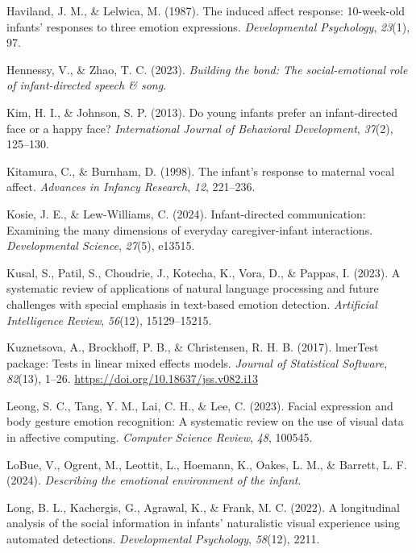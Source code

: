 \documentclass[10pt, letterpaper]{article}
\begin{document}
\begin{CSLReferences}{1}{0}
Haviland, J. M., \& Lelwica, M. (1987). The induced affect response:
10-week-old infants' responses to three emotion expressions.
\emph{Developmental Psychology}, \emph{23}(1), 97.

Hennessy, V., \& Zhao, T. C. (2023). \emph{Building the bond: The
social-emotional role of infant-directed speech \& song}.

Kim, H. I., \& Johnson, S. P. (2013). Do young infants prefer an
infant-directed face or a happy face? \emph{International Journal of
Behavioral Development}, \emph{37}(2), 125--130.

Kitamura, C., \& Burnham, D. (1998). The infant's response to maternal
vocal affect. \emph{Advances in Infancy Research}, \emph{12}, 221--236.

Kosie, J. E., \& Lew-Williams, C. (2024). Infant-directed communication:
Examining the many dimensions of everyday caregiver-infant interactions.
\emph{Developmental Science}, \emph{27}(5), e13515.

Kusal, S., Patil, S., Choudrie, J., Kotecha, K., Vora, D., \& Pappas, I.
(2023). A systematic review of applications of natural language
processing and future challenges with special emphasis in text-based
emotion detection. \emph{Artificial Intelligence Review}, \emph{56}(12),
15129--15215.

Kuznetsova, A., Brockhoff, P. B., \& Christensen, R. H. B. (2017).
{lmerTest} package: Tests in linear mixed effects models. \emph{Journal
of Statistical Software}, \emph{82}(13), 1--26.
\url{https://doi.org/10.18637/jss.v082.i13}

Leong, S. C., Tang, Y. M., Lai, C. H., \& Lee, C. (2023). Facial
expression and body gesture emotion recognition: A systematic review on
the use of visual data in affective computing. \emph{Computer Science
Review}, \emph{48}, 100545.

LoBue, V., Ogrent, M., Leottit, L., Hoemann, K., Oakes, L. M., \&
Barrett, L. F. (2024). \emph{Describing the emotional environment of the
infant}.

Long, B. L., Kachergis, G., Agrawal, K., \& Frank, M. C. (2022). A
longitudinal analysis of the social information in infants' naturalistic
visual experience using automated detections. \emph{Developmental
Psychology}, \emph{58}(12), 2211.


\end{CSLReferences}
\end{document}
